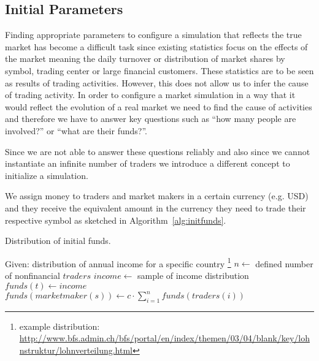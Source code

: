 \subsection{Initial Parameters}
Finding appropriate parameters to configure a simulation that reflects the
true market has become a difficult task since existing statistics focus on
the effects of the market meaning the daily turnover or distribution of market
shares by symbol, trading center or large financial customers. These statistics
are to be seen as results of trading activities. However, this does not allow
us to infer the cause of trading activity. In order to configure a market
simulation in a way that it would reflect the evolution of a real market we
need to find the cause of activities and therefore we have to answer key questions
such as ``how many people are involved?'' or ``what are their funds?''.

Since we are not able to answer these questions reliably and also since we cannot
instantiate an infinite number of traders we introduce a different concept to
initialize a simulation.

We assign money to traders and market makers in a certain currency (e.g. USD) and
they receive the equivalent amount in the currency they need to trade their respective
symbol as sketched in Algorithm~\ref{alg:initfunds}.

\begin{algorithm}
\caption{Distribution of initial funds.}
\label{alg:initfunds}
\begin{algorithmic}[1]
    \Statex Given: distribution of annual income for a specific country
    \footnote{example distribution: \url{http://www.bfs.admin.ch/bfs/portal/en/index/themen/03/04/blank/key/lohnstruktur/lohnverteilung.html}}
    \Statex
        \State  $n \gets$ defined number of nonfinancial $traders$
            \State $income \gets$ sample of income distribution
            \State $funds(t) \gets income$
        \EndFor
        \State $funds(marketmaker(s)) \gets c \cdot \sum_{i=1}^n funds(traders(i))$
    \EndFor
\end{algorithmic}
\end{algorithm}

%
%
%

